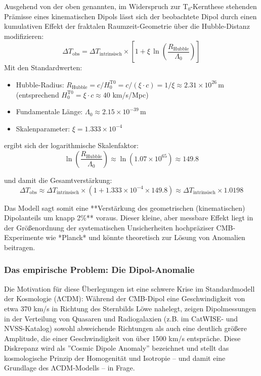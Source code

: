 	Ausgehend von der oben genannten, im Widerspruch zur T₀-Kernthese stehenden Prämisse eines kinematischen Dipols lässt sich der beobachtete Dipol durch einen kumulativen Effekt der fraktalen Raumzeit-Geometrie über die Hubble-Distanz modifizieren:
	\[
	\Delta T_{\text{obs}} = \Delta T_{\text{intrinsisch}} \times \left[1 + \xi \, \ln\left(\frac{R_{\text{Hubble}}}{\Lambda_0}\right)\right]
	\]
	Mit den Standardwerten:
	\begin{itemize}
		\item Hubble-Radius: $R_{\text{Hubble}} = c/H_0^{\text{T0}} = c/(\xi \cdot c) = 1/\xi \approx 2.31 \times 10^{26} \, \text{m}$ (entsprechend $H_0^{\text{T0}} = \xi \cdot c \approx 40$ km/s/Mpc)
		\item Fundamentale Länge: $\Lambda_0 \approx 2.15 \times 10^{-39} \, \text{m}$
		\item Skalenparameter: $\xi = 1.333 \times 10^{-4}$
	\end{itemize}
	
	ergibt sich der logarithmische Skalenfaktor:
	\[
	\ln\left(\frac{R_{\text{Hubble}}}{\Lambda_0}\right) \approx \ln(1.07 \times 10^{65}) \approx 149.8
	\]
	
	und damit die Gesamtverstärkung:
	\[
	\Delta T_{\text{obs}} \approx \Delta T_{\text{intrinsisch}} \times (1 + 1.333\times10^{-4} \times 149.8) \approx \Delta T_{\text{intrinsisch}} \times 1.0198
	\]
	
	Das Modell sagt somit eine **Verstärkung des geometrischen (kinematischen) Dipolanteils um knapp 2\%** voraus. Dieser kleine, aber messbare Effekt liegt in der Größenordnung der systematischen Unsicherheiten hochpräziser CMB-Experimente wie *Planck* und könnte theoretisch zur Lösung von Anomalien beitragen.
	
	\subsubsection*{Das empirische Problem: Die Dipol-Anomalie}
	
	Die Motivation für diese Überlegungen ist eine schwere Krise im Standardmodell der Kosmologie (ΛCDM): Während der CMB-Dipol eine Geschwindigkeit von etwa 370 km/s in Richtung des Sternbilds Löwe nahelegt, zeigen Dipolmessungen in der Verteilung von Quasaren und Radiogalaxien (z.B. im CatWISE- und NVSS-Katalog) sowohl abweichende Richtungen als auch eine deutlich größere Amplitude, die einer Geschwindigkeit von über 1500 km/s entspräche. Diese Diskrepanz wird als ''Cosmic Dipole Anomaly'' bezeichnet und stellt das kosmologische Prinzip der Homogenität und Isotropie – und damit eine Grundlage des ΛCDM-Modells – in Frage.
	
